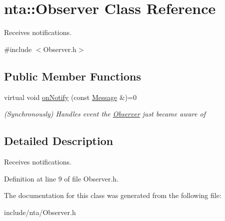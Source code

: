 \hypertarget{classnta_1_1Observer}{}\section{nta\+:\+:Observer Class Reference}
\label{classnta_1_1Observer}


Receives notifications.  




{\ttfamily \#include $<$Observer.\+h$>$}

\subsection*{Public Member Functions}
\begin{DoxyCompactItemize}
\item 
\mbox{\label{classnta_1_1Observer_af12cc337d76d1ca8a7f49edbb465eaa6}} 
virtual void \hyperlink{classnta_1_1Observer_af12cc337d76d1ca8a7f49edbb465eaa6}{on\+Notify} (const \hyperlink{structnta_1_1Message}{Message} \&)=0
\begin{DoxyCompactList}\small\item\em (Synchronously) Handles event the \hyperlink{classnta_1_1Observer}{Observer} just became aware of \end{DoxyCompactList}\end{DoxyCompactItemize}


\subsection{Detailed Description}
Receives notifications. 

Definition at line 9 of file Observer.\+h.



The documentation for this class was generated from the following file\+:\begin{DoxyCompactItemize}
\item 
include/nta/Observer.\+h\end{DoxyCompactItemize}

